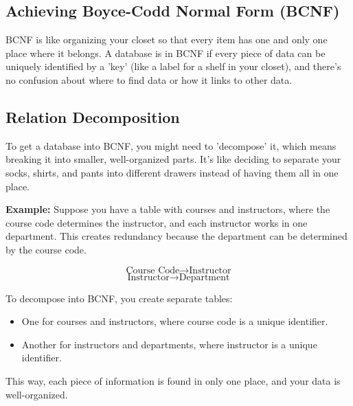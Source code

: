 \vspace{-0.6cm}
\subsection*{Achieving Boyce-Codd Normal Form (BCNF)}
\vspace{-0.1cm}

\noindent
BCNF is like organizing your closet so that every item has one and only one place where it belongs. A database is in BCNF if every piece of data can be uniquely identified by a 'key' (like a label for a shelf in your closet), and there's no confusion about where to find data or how it links to other data.

\vspace{-0.3cm}
\subsection*{Relation Decomposition}
\vspace{-0.1cm}

\noindent
To get a database into BCNF, you might need to 'decompose' it, which means breaking it into smaller, well-organized parts. It's like deciding to separate your socks, shirts, and pants into different drawers instead of having them all in one place.

\noindent
\textbf{Example:} Suppose you have a table with courses and instructors, where the course code determines the instructor, and each instructor works in one department. This creates redundancy because the department can be determined by the course code.

\[ \text{Course Code} \rightarrow \text{Instructor} \]
\[ \text{Instructor} \rightarrow \text{Department} \]

To decompose into BCNF, you create separate tables:
\begin{itemize}
    \item One for courses and instructors, where course code is a unique identifier.
    \item Another for instructors and departments, where instructor is a unique identifier.
\end{itemize}

This way, each piece of information is found in only one place, and your data is well-organized.
